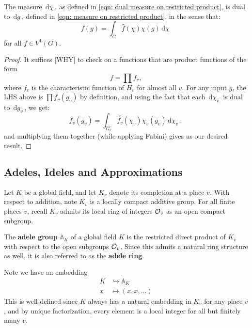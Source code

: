 \documentclass[11pt, x11names, openany]{book}
\renewcommand{\aa}{\mathbb{A}}
\newcommand{\inj}{\hookrightarrow}
\renewcommand{\hat}{\widehat}
\newcommand{\dg}{\, \mathrm{d}g \ }
\renewcommand{\d}[1]{\, \mathrm{d}#1 \ }
\begin{document}
\begin{prop}
\label{prop: duality of measure on restricted product}
The measure $\d{\chi}$, as defined in \ref{eqn: dual measure on restricted product}, is dual to $\dg$, defined in \ref{eqn: measure on restricted product}, in the sense that:
\begin{equation*}
    f(g) = \int_{\hat{G}} \hat{f}(\chi) \chi(g) \d{\chi}
\end{equation*}
for all $f \in V^1(G)$.
\end{prop}
\begin{proof}
    It suffices [WHY] to check on a functions that are product functions of the form
    \begin{equation*}
        f = \prod f_v,
    \end{equation*}
    where $f_v$ is the characteristic function of $H_v$ for almost all $v$. For any input $g$, the LHS above is $\prod f_v(g_v)$ by definition, and using the fact that each $\d{\chi_v}$ is dual to $\d{g_v}$, we get:
    \begin{equation*}
        f_v(g_v) = \int_{\hat{G_v}} \hat{f_v}(\chi_v) \chi_v(g_v) \d{\chi_v},
    \end{equation*}
    and multiplying them together (while applying Fubini) gives us our desired result.
\end{proof}


\subsection{Adeles, Ideles and Approximations}
\label{subsection: Approximation theorem Adeles}

Let $K$ be a global field, and let $K_v$ denote its completion at a place $v$. With respect to addition, note $K_v$ is a locally compact additive group. For all finite places $v$, recall $K_v$ admits its local ring of integers $\mathcal{O}_v$ as an open compact subgroup.

\begin{defn}
    The \textbf{adele group} $\aa_K$ of a global field $K$ is the restricted direct product of $K_v$ with respect to the open subgroups $\mathcal{O}_v$. Since this admits a natural ring structure as well, it is also referred to as the \textbf{adele ring}.
\end{defn}

Note we have an embedding
\begin{equation*}
\begin{split}
    K & \inj \aa_K\\
    x &\mapsto (x, x, \ldots)
\end{split}
\end{equation*}
This is well-defined since $K$ always has a natural embedding in $K_v$ for any place $v$, and by unique factorization, every element is a local integer for all but finitely many $v$.\\
\end{document}
